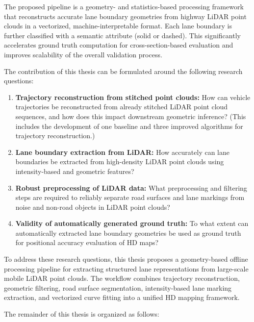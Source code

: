 The proposed pipeline is a geometry- and statistics-based processing framework that reconstructs accurate lane boundary geometries from highway LiDAR point clouds in a vectorized, machine-interpretable format. Each lane boundary is further classified with a semantic attribute (solid or dashed). This significantly accelerates ground truth computation for cross-section-based evaluation and improves scalability of the overall validation process.

The contribution of this thesis can be formulated around the following research questions:

\begin{enumerate}
  \item \textbf{Trajectory reconstruction from stitched point clouds:} How can vehicle trajectories be reconstructed from already stitched LiDAR point cloud sequences, and how does this impact downstream geometric inference? (This includes the development of one baseline and three improved algorithms for trajectory reconstruction.)
  \item \textbf{Lane boundary extraction from LiDAR:} How accurately can lane boundaries be extracted from high-density LiDAR point clouds using intensity-based and geometric features?
  \item \textbf{Robust preprocessing of LiDAR data:} What preprocessing and filtering steps are required to reliably separate road surfaces and lane markings from noise and non-road objects in LiDAR point clouds?
  \item \textbf{Validity of automatically generated ground truth:} To what extent can automatically extracted lane boundary geometries be used as ground truth for positional accuracy evaluation of HD maps?
\end{enumerate}

To address these research questions, this thesis proposes a geometry-based offline processing pipeline for extracting structured lane representations from large-scale mobile LiDAR point clouds. The workflow combines trajectory reconstruction, geometric filtering, road surface segmentation, intensity-based lane marking extraction, and vectorized curve fitting into a unified HD mapping framework.

The remainder of this thesis is organized as follows:

